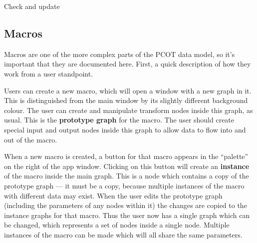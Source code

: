 \begin{todoblock}
Check and update
\end{todoblock}


\subsection{Macros}
\label{macros}
Macros are one of the more complex parts of the PCOT data model, so it's
important that they are documented here. First, a quick description
of how they work from a user standpoint.

Users can create a new macro, which will open a window with a new graph in it.
This is distinguished from the main window by its slightly different
background colour. The user can create and manipulate transform nodes inside
this graph, as usual. This is the \textbf{prototype graph} for the macro.
The user should create special input and output nodes inside this graph
to allow data to flow into and out of the macro.

When a new macro is created, a button for that macro appears in the ``palette''
on the right of the app window. Clicking on this button will create
an \textbf{instance} of the macro inside the main graph. This is a
node which contains a copy of the prototype graph --- it must be a copy,
because multiple instances of the macro with different data may exist.
When the user edits the prototype graph (including the parameters of 
any nodes within it) the changes are copied to the instance graphs for
that macro. Thus the user now has a single graph which can be changed,
which represents a set of nodes inside a single node. Multiple instances
of the macro can be made which will all share the same parameters.

